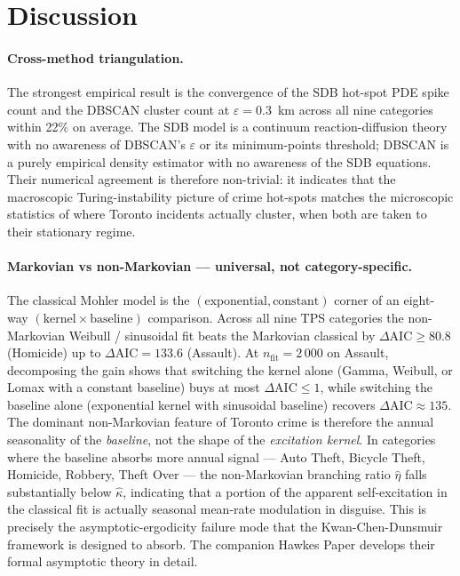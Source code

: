 \documentclass[11pt,a4paper]{article}
\newcommand{\1}{\mathbf{1}}
\theoremstyle{plain}
\theoremstyle{definition}
\begin{document}
\section{Discussion}\label{sec:discussion}

\paragraph{Cross-method triangulation.}  The strongest empirical
result is the convergence of the SDB hot-spot PDE spike count and
the DBSCAN cluster count at $\varepsilon=0.3$~km across all nine
categories within 22\% on average.  The SDB model is a continuum
reaction-diffusion theory with no awareness of DBSCAN's
$\varepsilon$ or its minimum-points threshold; DBSCAN is a purely
empirical density estimator with no awareness of the SDB equations.
Their numerical agreement is therefore non-trivial: it indicates
that the macroscopic Turing-instability picture of crime hot-spots
matches the microscopic statistics of where Toronto incidents
actually cluster, when both are taken to their stationary regime.

\paragraph{Markovian vs non-Markovian — universal, not category-specific.}
The classical Mohler model is the
$(\text{exponential},\text{constant})$ corner of an eight-way
$(\text{kernel}\times\text{baseline})$ comparison.  Across all
nine TPS categories the non-Markovian Weibull / sinusoidal fit
beats the Markovian classical by $\Delta\mathrm{AIC}\ge 80.8$
(Homicide) up to $\Delta\mathrm{AIC} = 133.6$ (Assault).  At
$n_{\text{fit}}=2\,000$ on Assault, decomposing the gain shows
that switching the kernel alone (Gamma, Weibull, or Lomax with a
constant baseline) buys at most $\Delta\mathrm{AIC}\le 1$, while
switching the baseline alone (exponential kernel with sinusoidal
baseline) recovers $\Delta\mathrm{AIC}\approx 135$.  The dominant
non-Markovian feature of Toronto crime is therefore the annual
seasonality of the \emph{baseline}, not the shape of the
\emph{excitation kernel}.  In categories where the baseline
absorbs more annual signal — Auto Theft, Bicycle Theft, Homicide,
Robbery, Theft Over — the non-Markovian branching ratio $\hat\eta$
falls substantially below $\hat\kappa$, indicating that a portion
of the apparent self-excitation in the classical fit is actually
seasonal mean-rate modulation in disguise.  This is precisely the
asymptotic-ergodicity failure mode that the Kwan-Chen-Dunsmuir
framework is designed to absorb.  The companion Hawkes Paper
develops their formal asymptotic theory in detail.
\end{document}
